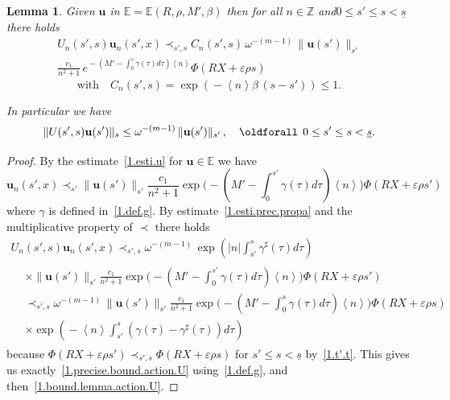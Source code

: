 \documentclass[10pt]{amsart}
\newtheorem{lemm}[cdrthm]{Lemma}
\theoremstyle{definition}
\theoremstyle{plain}
\newcommand*\e{\varepsilon}
\newcommand*\Z{{\mathbb Z}}
\newcommand*\EE{{\mathbb E}}
\newcommand*\g{\gamma}
\newcommand{\ubf}{{\mathbf u}}
\newcommand*\und{\underline}
\renewcommand*{\forall}{\mathrel{\oldforall}}
\begin{document}
\begin{lemm}\label{1.lemma.action.U}
Given $\ubf$ in $\EE = \EE(R,\rho,M',\beta)$ then for all $n\in\Z$ and\linebreak$0 \leq s' \leq s < \und{s}$ there holds
\begin{multline}\label{1.precise.bound.action.U}
U_n(s',s)\ubf_n(s',x)
\prec_{s',s} C_n(s',s) \,\omega^{-(m-1)}\,\|\ubf(s')\|_{s'}\\ \frac{\displaystyle c_1}{\displaystyle n^2+1} \, e^{{}-(M'-\int_{0}^{s}\g(\tau) d\tau)\left< n \right>} \Phi\left(R X+\e\rho s\right)
\end{multline}
\begin{equation}\label{1.defi.Cn}
\text{with} \quad C_n(s',s) = \exp\left({}- \left<n\right> \beta \,(s-s') \right) \leq 1.
\end{equation}

In particular we have
\begin{equation}\label{1.bound.lemma.action.U}
\|U(s',s)\ubf(s')\|_s \leq \omega^{-(m-1)}\, \|\ubf(s')\|_{s'} \,, \quad \forall \, 0 \leq s' \leq s < \und{s}.
\end{equation}
\end{lemm}

\begin{proof}
By the estimate~\eqref{1.esti.u} for $\ubf\in\EE$ we have
\[
\ubf_n(s',x)
\prec_{s'} \|\ubf(s')\|_{s'} \frac{\displaystyle c_1}{\displaystyle n^2+1}\exp\Big({}-(M' - \int_{0}^{s'} \g(\tau)d\tau)\left< n \right>\Big) \Phi\left(R X+\e\rho s'\right)
\]
where $\g$ is defined in~\eqref{1.def.g}. By estimate~\eqref{1.esti.prec.propa} and the multiplicative property of $\prec$ there holds
\begin{multline*}
U_n(s',s)\ubf_n(s',x) \prec_{s',s} \omega^{-(m-1)}\,\exp\left(|n| \int_{s'}^{s} \g^{\sharp}(\tau) d\tau \right) \\
\begin{aligned}
& \times\|\ubf(s')\|_{s'} \frac{\displaystyle c_1}{\displaystyle n^2+1}\exp\Big({}-(M'- \int_{0}^{s'} \g(\tau)d\tau)\left< n \right>\Big) \Phi\left(R X+\e\rho s'\right) \\
& \prec_{s',s} \omega^{-(m-1)}\,\|\ubf(s')\|_{s'} \frac{\displaystyle c_1}{\displaystyle n^2+1}\exp\Big({}-(M' - \int_{0}^{s} \g(\tau)d\tau)\left< n \right>\Big) \Phi\left(R X+\e\rho s\right) \\
& \times \exp\left({}- \left<n\right> \int_{s'}^{s} \left(\g(\tau) - \g^{\sharp}(\tau) \right) d\tau \right)
\end{aligned}
\end{multline*}
because $\Phi(R X + \e\rho s') \prec_{s',s} \Phi(R X + \e\rho s)$ for $s' \leq s < \und{s}$ by~\eqref{1.t'.t}. This gives us exactly~\eqref{1.precise.bound.action.U} using~\eqref{1.def.g}, and then~\eqref{1.bound.lemma.action.U}.
\end{proof}
\end{document}
